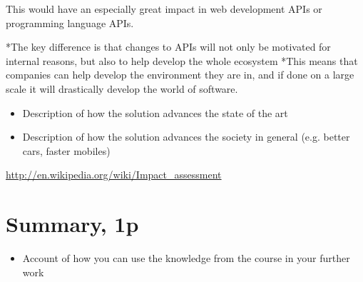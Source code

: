 \documentclass{article}
\begin{document}
This would have an especially great impact in web development APIs or programming language APIs. 


*The key difference is that changes to APIs will not only be motivated for internal reasons, but also to help develop the whole ecosystem 
*This means that companies can help develop the environment they are in, and if done on a large scale it will drastically develop the world of software. 



\begin{itemize}
	\item Description of how the solution advances the state of the art
	\item Description of how the solution advances the society in general (e.g. better cars, faster mobiles)
\end{itemize}

\url{http://en.wikipedia.org/wiki/Impact_assessment}


\section{Summary, 1p}

\begin{itemize}
	\item Account of how you can use the knowledge from the course in your further work
\end{itemize}
\end{document}
